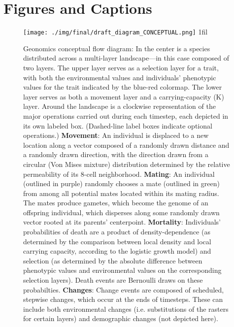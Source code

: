 ﻿\documentclass{article}
\makeatletter
\newcommand*{\centerfloat}{%
    \parindent \z@
    \leftskip \z@ \@plus 1fil \@minus \textwidth
    \rightskip\leftskip
    \parfillskip \z@skip}
\makeatother
\begin{document}
\pagebreak
\section{Figures and Captions}

\begin{figure}[H]
\texttt{[image: ./img/final/draft\_diagram\_CONCEPTUAL.png]}
        \centerfloat
        \caption{Geonomics conceptual flow diagram: In the center is a species
                 distributed across a multi-layer landscape---in this case
                 composed of two layers.
                 The upper layer serves as a selection
                 layer for a trait, with both the environmental values and
                 individuals' phenotypic values for the trait indicated by
                 the blue-red colormap.
                 The lower layer serves as both a movement
                 layer and a carrying-capacity (K) layer.
                 Around the landscape is a clockwise representation
                 of the major operations carried out during each timestep,
                 each depicted in its own labeled box. (Dashed-line label boxes
                 indicate optional operations.)
                 \textbf{Movement}: An individual is displaced to a
                 new location along a vector composed of a randomly drawn distance
                 and a randomly drawn direction, with the direction
                 drawn from a circular (Von Mises mixture) distribution determined by
                 the relative permeability of its 8-cell neighborhood.
                 \textbf{Mating}: An individual (outlined in purple) randomly chooses
                 a mate (outlined in green) from among all potential mates located
                 within its mating radius. The mates produce gametes, which become
                 the genome of an offspring individual, which disperses along some
                 randomly drawn vector rooted at its parents' centerpoint.  
                 \textbf{Mortality}: Individuals' probabilities of death are
                 a product of density-dependence (as determined by the comparison
                 between local density and local carrying
                 capacity, according to the logistic growth model) and selection
                 (as determined by the absolute difference between
                 phenotypic values and environmental values on the corresponding
                 selection layers).
                 Death events are Bernoulli draws on these probabilties.
                 \textbf{Changes}: Change events are composed of scheduled,
                 stepwise changes, which occur at the ends of timesteps.
                 These can include both environmental changes (i.e. substitutions
                 of the rasters for certain layers) and demographic changes
                 (not depicted here).}
        \label{fig:flow}
\end{figure}
\end{document}
